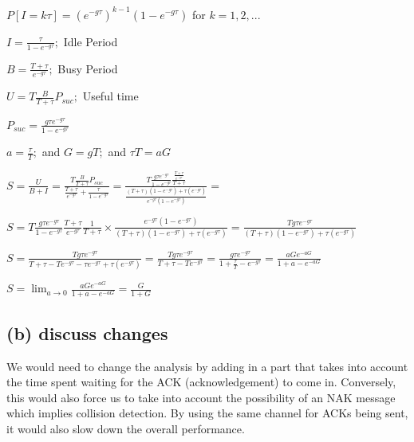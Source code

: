 \documentclass[12pt]{article}
\begin{document}
 $P[I = k\tau ] = \displaystyle (e^{-g\tau})^{k-1}(1-e^{-g\tau})$  $ {  } $for $  k = 1, 2, ... $
  
 $I = \displaystyle \frac \tau {1-e^{-g\tau}};$ Idle Period
 
 $B = \displaystyle \frac {T+\tau} {e^{-g\tau}}; $  Busy Period
 
 $U = \displaystyle T\frac  {B} {T+\tau} P_{suc}; $  Useful time
 
 $P_{suc} = \displaystyle \frac {g\tau e^{-g\tau}} {1-e^{-g\tau}} $
 
 $ a = \displaystyle \frac \tau T ;$  and $ G = gT;$ and $\tau T = aG$
 
 $S =  \displaystyle \frac U {B+I} = \frac {\displaystyle T\frac  {B} {T+\tau} P_{suc}} {  \displaystyle \frac {T+\tau} {e^{-g\tau}} +  \displaystyle \frac \tau {1-e^{-g\tau}}} 
 = \frac {\displaystyle T  \displaystyle \frac {g\tau e^{-g\tau}} {1-e^{-g\tau}} \frac  {\displaystyle \frac {T+\tau} {e^{-g\tau}}} {T+\tau} } {  \displaystyle \frac {(T+\tau)(1-e^{-g\tau}) + \tau(e^{-g\tau})} {e^{-g\tau}(1-e^{-g\tau})} } = $

$S =  {\displaystyle T  \displaystyle \frac {g\tau e^{-g\tau}} {1-e^{-g\tau}}   {\displaystyle \frac {T+\tau} {e^{-g\tau}}} \frac 1 {T+\tau} }  \times  {  \displaystyle \frac {e^{-g\tau}(1-e^{-g\tau})} {(T+\tau)(1-e^{-g\tau}) + \tau(e^{-g\tau})} }
= {  \displaystyle \frac {Tg\tau e^{-g\tau}} {(T+\tau)(1-e^{-g\tau}) + \tau(e^{-g\tau})} } $

$ S = {  \displaystyle \frac {Tg\tau e^{-g\tau}} {T+\tau -Te^{-g\tau} -\tau e^{-g\tau} + \tau(e^{-g\tau})} } 
= {  \displaystyle \frac {Tg\tau e^{-g\tau}} {T+\tau -Te^{-g\tau} } } 
= {  \displaystyle \frac {g\tau e^{-g\tau}} {1+\frac \tau T - e^{-g\tau} } } 
= {  \displaystyle \frac {aG e^{-aG}} {1+ a - e^{-aG} } } $

$ S = \displaystyle \lim_{a \rightarrow 0} \displaystyle \frac {aG e^{-aG}} {1+ a - e^{-aG} } =  \displaystyle \frac {G} {1+ G}   $
 

 \subsection*{(b) discuss changes}   We would need to change the analysis by adding in a part that takes into account the time spent waiting for the ACK (acknowledgement) to come in.  Conversely, this would also force us to take into account the possibility of an NAK message which implies collision detection.  By using the same channel for ACKs being sent, it would also slow down the overall performance.
 
\end{document}

